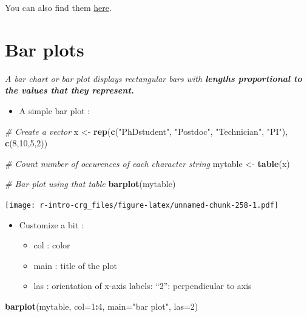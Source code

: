 \documentclass[]{book}
\newenvironment{Shaded}{\begin{snugshade}}{\end{snugshade}}
\newcommand{\CommentTok}[1]{\textcolor[rgb]{0.56,0.35,0.01}{\textit{#1}}}
\newcommand{\DataTypeTok}[1]{\textcolor[rgb]{0.13,0.29,0.53}{#1}}
\newcommand{\DecValTok}[1]{\textcolor[rgb]{0.00,0.00,0.81}{#1}}
\newcommand{\KeywordTok}[1]{\textcolor[rgb]{0.13,0.29,0.53}{\textbf{#1}}}
\newcommand{\NormalTok}[1]{#1}
\newcommand{\OperatorTok}[1]{\textcolor[rgb]{0.81,0.36,0.00}{\textbf{#1}}}
\newcommand{\StringTok}[1]{\textcolor[rgb]{0.31,0.60,0.02}{#1}}
\providecommand{\tightlist}{%
  \setlength{\itemsep}{0pt}\setlength{\parskip}{0pt}}
\begin{document}
You can also find them \href{http://www.stat.columbia.edu/~tzheng/files/Rcolor.pdf}{here}.

\hypertarget{bar-plots}{%
\section{Bar plots}\label{bar-plots}}

\emph{A bar chart or bar plot displays rectangular bars with \textbf{lengths proportional to the values that they represent.}}

\begin{itemize}
\tightlist
\item
  A simple bar plot :
\end{itemize}

\begin{Shaded}
\begin{Highlighting}[]
\CommentTok{# Create a vector}
\NormalTok{x <-}\StringTok{ }\KeywordTok{rep}\NormalTok{(}\KeywordTok{c}\NormalTok{(}\StringTok{"PhDstudent"}\NormalTok{, }\StringTok{"Postdoc"}\NormalTok{, }\StringTok{"Technician"}\NormalTok{, }\StringTok{"PI"}\NormalTok{), }\KeywordTok{c}\NormalTok{(}\DecValTok{8}\NormalTok{,}\DecValTok{10}\NormalTok{,}\DecValTok{5}\NormalTok{,}\DecValTok{2}\NormalTok{))}

\CommentTok{# Count number of occurences of each character string}
\NormalTok{mytable <-}\StringTok{ }\KeywordTok{table}\NormalTok{(x)}

\CommentTok{# Bar plot using that table}
\KeywordTok{barplot}\NormalTok{(mytable)}
\end{Highlighting}
\end{Shaded}

\texttt{[image: r-intro-crg\_files/figure-latex/unnamed-chunk-258-1.pdf]}

\begin{itemize}
\tightlist
\item
  Customize a bit :

  \begin{itemize}
  \tightlist
  \item
    col : color
  \item
    main : title of the plot
  \item
    las : orientation of x-axis labels: ``2'': perpendicular to axis
  \end{itemize}
\end{itemize}

\begin{Shaded}
\begin{Highlighting}[]
\KeywordTok{barplot}\NormalTok{(mytable,}
    \DataTypeTok{col=}\DecValTok{1}\OperatorTok{:}\DecValTok{4}\NormalTok{,}
    \DataTypeTok{main=}\StringTok{"bar plot"}\NormalTok{,}
    \DataTypeTok{las=}\DecValTok{2}\NormalTok{)}
\end{Highlighting}
\end{Shaded}
\end{document}
